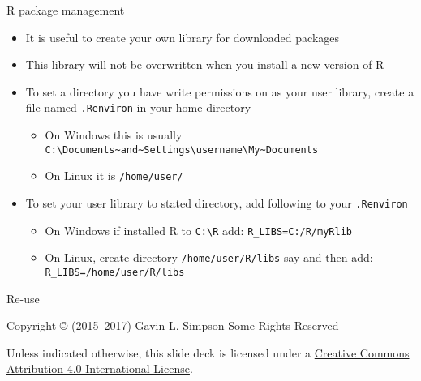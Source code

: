 \documentclass[10pt,ignorenonframetext,compress, aspectratio=169]{beamer}
\providecommand{\tightlist}{%
  \setlength{\itemsep}{0pt}\setlength{\parskip}{0pt}}
\begin{document}
\begin{frame}[fragile]{R package management}

\begin{itemize}
\tightlist
\item
  It is useful to create your own library for downloaded packages
\item
  This library will not be overwritten when you install a new version of
  R
\item
  To set a directory you have write permissions on as your user library,
  create a file named \texttt{.Renviron} in your home directory

  \begin{itemize}
  \tightlist
  \item
    On Windows this is usually
    \texttt{C:\textbackslash{}Documents\textasciitilde{}and\textasciitilde{}Settings\textbackslash{}username\textbackslash{}My\textasciitilde{}Documents}
  \item
    On Linux it is \texttt{/home/user/}
  \end{itemize}
\item
  To set your user library to stated directory, add following to your
  \texttt{.Renviron}

  \begin{itemize}
  \tightlist
  \item
    On Windows if installed R to \texttt{C:\textbackslash{}R} add:
    \texttt{R\_LIBS=C:/R/myRlib}
  \item
    On Linux, create directory \texttt{/home/user/R/libs} say and then
    add: \texttt{R\_LIBS=/home/user/R/libs}
  \end{itemize}
\end{itemize}

\end{frame}

\begin{frame}{Re-use}

Copyright © (2015--2017) Gavin L. Simpson Some Rights Reserved

Unless indicated otherwise, this slide deck is licensed under a
\href{http://creativecommons.org/licenses/by/4.0/}{Creative Commons
Attribution 4.0 International License}.

\begin{center}
  \ccby
\end{center}

\end{frame}
\end{document}
